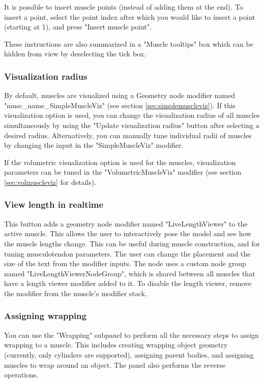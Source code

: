 \documentclass{article}
\begin{document}
It is possible to insert muscle points (instead of adding them at the end). To insert a point, select the point index after which you would like to insert a point (starting at 1), and press "Insert muscle point".

These instructions are also summarized in a "Muscle tooltips" box which can be hidden from view by deselecting the tick box.


\subsubsection{Visualization radius}
By default, muscles are visualized using a Geometry node modifier named "musc\_name\_SimpleMuscleViz" (see section \ref{sec:simplemuscleviz}). If this visualization option is used, you can change the visualization radius of all muscles simultaneously by using the "Update visualization radius" button after selecting a desired radius. Alternatively, you can manually tune individual radii of muscles by changing the input in the "SimpleMuscleViz" modifier.

If the volumetric visualization option is used for the muscles, visualization parameters can be tuned in the "VolumetricMuscleViz" modifier (see section \ref{sec:volmuscleviz} for details).

\subsubsection{View length in realtime}

This button adds a geometry node modifier named "LiveLengthViewer" to the active muscle. This allows the user to interactively pose the model and see how the muscle lengths change. This can be useful during muscle construction, and for tuning musculotendon parameters. The user can change the placement and the size of the text from the modifier inputs. %
The node uses a custom node group named "LiveLengthViewerNodeGroup", which is shared between all muscles that have a length viewer modifier added to it. To disable the length viewer, remove the modifier from the muscle's modifier stack.


\subsubsection{Assigning wrapping}

You can use the "Wrapping" subpanel to perform all the necessary steps to assign wrapping to a muscle. This includes creating wrapping object geometry (currently, only cylinders are supported), assigning parent bodies, and assigning muscles to wrap around an object. The panel also performs the reverse operations. 
\end{document}

